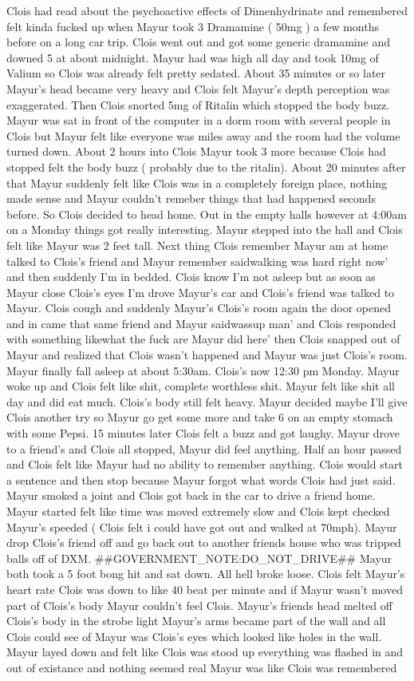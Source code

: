 \documentclass[12pt]{book}
\begin{document}
Clois had read about the psychoactive effects of Dimenhydrinate and remembered felt kinda fucked up when Mayur took 3 Dramamine ( 50mg ) a few months before on a long car trip. Clois went out and got some generic dramamine and downed 5 at about midnight. Mayur had was high all day and took 10mg of Valium so Clois was already felt pretty sedated. About 35 minutes or so later Mayur's head became very heavy and Clois felt Mayur's depth perception was exaggerated. Then Clois snorted 5mg of Ritalin which stopped the body buzz. Mayur was sat in front of the computer in a dorm room with several people in Clois but Mayur felt like everyone was miles away and the room had the volume turned down. About 2 hours into Clois Mayur took 3 more because Clois had stopped felt the body buzz ( probably due to the ritalin). About 20 minutes after that Mayur suddenly felt like Clois was in a completely foreign place, nothing made sense and Mayur couldn't remeber things that had happened seconds before. So Clois decided to head home. Out in the empty halls however at 4:00am on a Monday things got really interesting. Mayur stepped into the hall and Clois felt like Mayur was 2 feet tall. Next thing Clois remember Mayur am at home talked to Clois's friend and Mayur remember saidwalking was hard right now' and then suddenly I'm in bedded. Clois know I'm not asleep but as soon as Mayur close Clois's eyes I'm drove Mayur's car and Clois's friend was talked to Mayur. Clois cough and suddenly Mayur's Clois's room again the door opened and in came that same friend and Mayur saidwassup man' and Clois responded with something likewhat the fuck are Mayur did here' then Clois snapped out of Mayur and realized that Clois wasn't happened and Mayur was just Clois's room. Mayur finally fall asleep at about 5:30am. Clois's now 12:30 pm Monday. Mayur woke up and Clois felt like shit, complete worthless shit. Mayur felt like shit all day and did eat much. Clois's body still felt heavy. Mayur decided maybe I'll give Clois another try so Mayur go get some more and take 6 on an empty stomach with some Pepsi. 15 minutes later Clois felt a buzz and got laughy. Mayur drove to a friend's and Clois all stopped, Mayur did feel anything. Half an hour passed and Clois felt like Mayur had no ability to remember anything. Clois would start a sentence and then stop because Mayur forgot what words Clois had just said. Mayur smoked a joint and Clois got back in the car to drive a friend home. Mayur started felt like time was moved extremely slow and Clois kept checked Mayur's speeded ( Clois felt i could have got out and walked at 70mph). Mayur drop Clois's friend off and go back out to another friends house who was tripped balls off of DXM. \#\#GOVERNMENT\_NOTE:DO\_NOT\_DRIVE\#\# Mayur both took a 5 foot bong hit and sat down. All hell broke loose. Clois felt Mayur's heart rate Clois was down to like 40 beat per minute and if Mayur wasn't moved part of Clois's body Mayur couldn't feel Clois. Mayur's friends head melted off Clois's body in the strobe light Mayur's arms became part of the wall and all Clois could see of Mayur was Clois's eyes which looked like holes in the wall. Mayur layed down and felt like Clois was stood up everything was flashed in and out of existance and nothing seemed real Mayur was like Clois was remembered 
\end{document}
